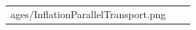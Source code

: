 \documentclass[journal, letterpaper]{IEEEtran}
\begin{document}
\begin{figure}
\begin{tabular}{ccc}
ages/InflationParallelTransport.png} 

\end{tabular}
\end{figure}
\end{document}
